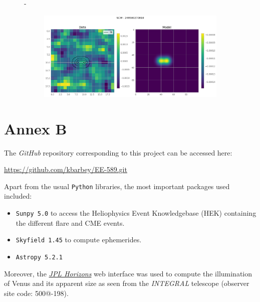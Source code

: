 \documentclass[
	a4paper, %
	10pt, %
	unnumberedsections, %
	twoside, %
]{LTJournalArticle}
\begin{document}
\begin{figure}[H]
\begin{subfigure}{.4\textwidth}
    \end{subfigure}
    \hspace{1em}-
    \begin{subfigure}{.4\textwidth}
        \includegraphics[width=\textwidth]{report/Figures/models/2404/27_psf_const.png}
    \end{subfigure}%
    \caption{}
    \label{model_notconst_24}
    \end{figure}


\section{Annex B}
The \textit{GitHub} repository corresponding to this project can be accessed here:

\url{https://github.com/kbarbey/EE-589.git}

Apart from the usual \texttt{Python} libraries, the most important packages used included:

\begin{itemize}
    \item \texttt{Sunpy 5.0}\cite{Barnes2020ThePackage} to access the Heliophysics Event Knowledgebase (HEK) containing the different flare and CME events.
    \item \texttt{Skyfield 1.45} to compute ephemerides.
    \item \texttt{Astropy 5.2.1}
\end{itemize}

Moreover, the \href{https://ssd.jpl.nasa.gov/horizons/app.html}{\textit{JPL Horizons}} web interface was used to compute the illumination of Venus and its apparent size as seen from the \textit{INTEGRAL} telescope (observer site code: 500@-198).

\nocite{*}
\printbibliography %

\end{document}
